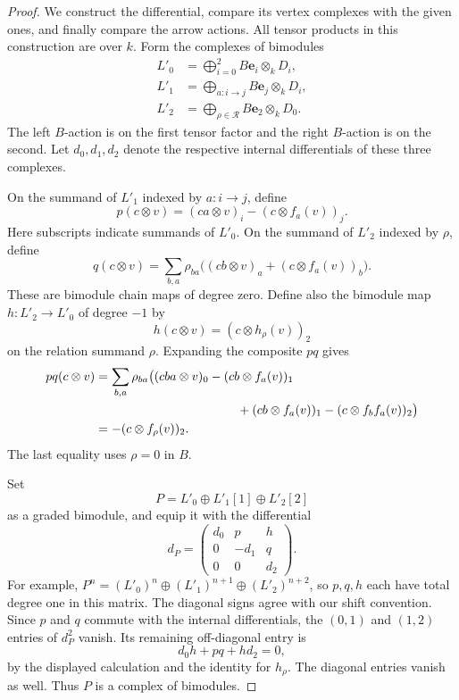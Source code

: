 \begin{proof}
We construct the differential, compare its vertex complexes with the
given ones, and finally compare the arrow actions. All tensor products
in this construction are over \(k\). Form the
complexes of bimodules
\begin{align*}
 L'_0&=\bigoplus_{i=0}^2 B\mathbf e_i\otimes_k D_i,\\
 L'_1&=\bigoplus_{a:i\to j}B\mathbf e_j\otimes_k D_i,\\
 L'_2&=\bigoplus_{\rho\in\mathcal R}B\mathbf e_2\otimes_k D_0.
\end{align*}
The left \(B\)-action is on the first tensor factor and the right
\(B\)-action is on the second.  Let
\(d_0,d_1,d_2\) denote the respective internal differentials of these
three complexes.

On the summand of \(L'_1\) indexed by \(a:i\to j\), define
\[
 p(c\otimes v)
  =(ca\otimes v)_i-(c\otimes f_a(v))_j .
\]
Here subscripts indicate summands of \(L'_0\).  On the summand of
\(L'_2\) indexed by \(\rho\), define
\[
 q(c\otimes v)
  =\sum_{b,a}\rho_{ba}
       \bigl((cb\otimes v)_a+(c\otimes f_a(v))_b\bigr).
\]
These are bimodule chain maps of degree zero.  Define also the
bimodule map \(h:L'_2\to L'_0\) of degree \(-1\) by
\[
 h(c\otimes v)=(c\otimes h_\rho(v))_2
\]
on the relation summand \(\rho\).  Expanding the composite \(pq\)
gives
\begin{align*}
 pq(c\otimes v)
 &=\sum_{b,a}\rho_{ba}
   \bigl(
     (cba\otimes v)_0-(cb\otimes f_a(v))_1\\
 &\hspace{40mm}
     +(cb\otimes f_a(v))_1-(c\otimes f_bf_a(v))_2
   \bigr)\\
 &=-(c\otimes f_\rho(v))_2.
\end{align*}
The last equality uses \(\rho=0\) in \(B\).

Set
\[
 P=L'_0\oplus L'_1[1]\oplus L'_2[2]
\]
as a graded bimodule, and equip it with the differential
\[
 d_P=
 \begin{pmatrix}
   d_0 & p    & h\\
   0   & -d_1 & q\\
   0   & 0    & d_2
 \end{pmatrix}.
\]
For example, \(P^n=(L'_0)^n\oplus(L'_1)^{n+1}
\oplus(L'_2)^{n+2}\), so \(p,q,h\) each have total degree one
in this matrix.  The diagonal signs agree with our shift convention.
Since \(p\) and \(q\) commute with the internal differentials,
the \((0,1)\) and \((1,2)\) entries of \(d_P^2\) vanish.
Its remaining off-diagonal entry is
\[
 d_0h+pq+hd_2=0,
\]
by the displayed calculation and the identity for \(h_\rho\).
The diagonal entries vanish as well.  Thus \(P\) is a complex of
bimodules.


\end{proof}
